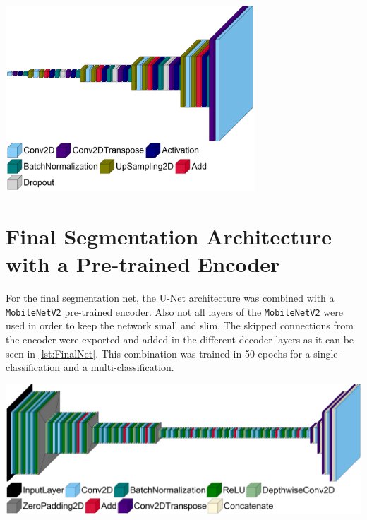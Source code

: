 \begin{minipage}[t]{\textwidth}
\centering
	\includegraphics[width=0.7\textwidth]{Images/model_plot/advanced_decoder.png}
	\label{fig:Model_advanced_decoder}
\end{minipage}

\section{Final Segmentation Architecture with a Pre-trained Encoder}
For the final segmentation net, the U-Net architecture was combined with a \verb|MobileNetV2| pre-trained encoder. Also not all layers of the \verb|MobileNetV2| were used in order to keep the network small and slim. The skipped connections from the encoder were exported and added in the different decoder layers as it can be seen in \cref{lst:FinalNet}. This combination was trained in 50 epochs for a single-classification and a multi-classification.\\

\begin{minipage}[t]{\textwidth}
\centering
	\includegraphics[width=\textwidth]{Images/model_plot/unet_mobilenet_v2.png}
	\label{fig:Final_model}
\end{minipage}

